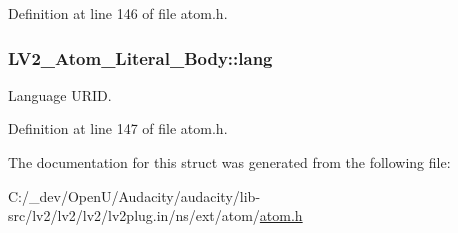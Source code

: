 Definition at line 146 of file atom.\+h.

\subsubsection[{\texorpdfstring{lang}{lang}}]{ L\+V2\+\_\+\+Atom\+\_\+\+Literal\+\_\+\+Body\+::lang}\hypertarget{struct_l_v2___atom___literal___body_a4b87355649129047e4a736ea99c56a88}{}\label{struct_l_v2___atom___literal___body_a4b87355649129047e4a736ea99c56a88}
Language U\+R\+ID. 

Definition at line 147 of file atom.\+h.



The documentation for this struct was generated from the following file\+:\begin{DoxyCompactItemize}
\item 
C\+:/\+\_\+dev/\+Open\+U/\+Audacity/audacity/lib-\/src/lv2/lv2/lv2/lv2plug.\+in/ns/ext/atom/\hyperlink{atom_8h}{atom.\+h}\end{DoxyCompactItemize}
